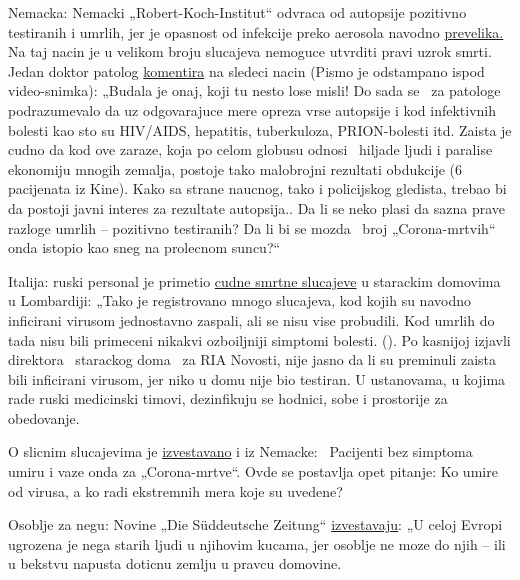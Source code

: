 Nemacka: Nemacki „Robert-Koch-Institut`` odvraca od autopsije pozitivno
testiranih i umrlih, jer je opasnost od infekcije preko aerosola navodno
\href{https://www.youtube.com/watch?v=gSn_YaOYYcY}{prevelika.} Na taj
nacin je u velikom broju slucajeva nemoguce utvrditi pravi uzrok smrti.
Jedan doktor patolog
\href{https://www.youtube.com/watch?v=gSn_YaOYYcY}{komentira} na sledeci
nacin (Pismo je odstampano ispod video-snimka): „Budala je onaj, koji tu
nesto lose misli! Do sada se ~za patologe podrazumevalo da uz
odgovarajuce mere opreza vrse autopsije i kod infektivnih bolesti kao
sto su HIV/AIDS, hepatitis, tuberkuloza, PRION-bolesti itd. Zaista je
cudno da kod ove zaraze, koja po celom globusu odnosi~ hiljade ljudi i
paralise ekonomiju mnogih zemalja, postoje tako malobrojni rezultati
obdukcije (6 pacijenata iz Kine). Kako sa strane naucnog, tako i
policijskog gledista, trebao bi da postoji javni interes za rezultate
autopsija.. Da li se neko plasi da sazna prave razloge umrlih --
pozitivno testiranih? Da li bi se mozda ~broj „Corona-mrtvih`` onda
istopio kao sneg na prolecnom suncu?``

Italija: ruski personal je primetio
\href{https://de.sputniknews.com/panorama/20200402326767475-fachpersonal-todesfaelle-lombardei-zeitung/}{cudne
smrtne slucajeve} u starackim domovima u Lombardiji: „Tako je
registrovano mnogo slucajeva, kod kojih su navodno inficirani virusom
jednostavno zaspali, ali se nisu vise probudili. Kod umrlih do tada nisu
bili primeceni nikakvi ozboiljniji simptomi bolesti. (). Po kasnijoj
izjavli direktora ~starackog doma ~za RIA Novosti, nije jasno da li su
preminuli zaista bili inficirani virusom, jer niko u domu nije bio
testiran. U ustanovama, u kojima rade ruski medicinski timovi,
dezinfikuju se hodnici, sobe i prostorije za obedovanje.

O slicnim slucajevima je
\href{https://web.archive.org/web/20200330082928/https:/www.sueddeutsche.de/panorama/coronavirus-news-deutschland-wolfsburg-laschet-1.4828033}{izvestavano}
i iz Nemacke:~ Pacijenti bez simptoma umiru i vaze onda za
„Corona-mrtve``. Ovde se postavlja opet pitanje: Ko umire od virusa, a
ko radi ekstremnih mera koje su uvedene?

Osoblje za negu: Novine „Die Süddeutsche Zeitung``
\href{https://web.archive.org/web/20200330082928/https:/www.sueddeutsche.de/panorama/coronavirus-news-deutschland-wolfsburg-laschet-1.4828033}{izvestavaju}:
„U celoj Evropi ugrozena je nega starih ljudi u njihovim kucama, jer
osoblje ne moze do njih -- ili u bekstvu napusta doticnu zemlju u pravcu
domovine.

